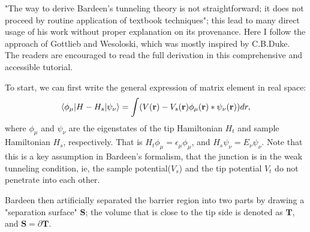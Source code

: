 "The way to derive Bardeen's tunneling theory is not straightforward; it does not proceed by routine application of textbook techniques"\cite{gottliebBardeensTunnelingTheory}; this lead to many direct usage of his work without proper explanation on its provenance. Here I follow the approach of Gottlieb and Wesoloski\cite{gottliebBardeensTunnelingTheory}, which was mostly inspired by C.B.Duke\cite{dukeTunnelingSolids1973}. The readers are encouraged to read the full derivation in this comprehensive and accessible tutorial\cite{gottliebBardeensTunnelingTheory}. 

To start, we can first write the general expression of matrix element in real space: 
\begin{equation}
	\label{eq:bardeen_1}
	\braket{\phi_{\mu}|H-H_s|\psi_{\nu}} = \int(V(\mathbf{r})- V_s(\mathbf{r})\phi_{\mu}(\mathbf{r})*\psi_{\nu}(\mathbf{r}))dr,
\end{equation}
where $\phi_{\mu}$ and $\psi_{\nu}$ are the eigenstates of the tip Hamiltonian $H_t$ and sample Hamiltonian $H_s$, respectively. That is $H_t \phi_{\mu} = \epsilon_{\mu} \phi_{\mu}$, and $H_s \psi_{\nu} = E_{\nu} \psi_{\nu}$. Note that this is a key assumption in Bardeen's formalism, that the junction is in the weak tunneling condition, ie, the sample potential($V_s$) and the tip potential $V_t$ do not penetrate into each other. 

Bardeen then artificially separated the barrier region into two parts by drawing a "separation surface" $\mathbf{S}$; the volume that is close to the tip side is denoted as $\mathbf{T}$, and $\mathbf{S} = \partial \mathbf{T}$.

